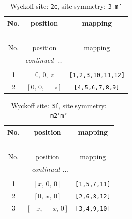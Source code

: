 \documentclass[fleqn,8pt]{jsarticle}
\begin{document}
\begin{longtable}{ccc}
\caption{Wyckoff site: {\tt 2e}, site symmetry: {\tt 3.m'}}
 \\
 \hline \hline
No. & position & mapping \\ \hline \endfirsthead

\multicolumn{2}{l}{\tablename\ \thetable{}} \\
 \hline \hline
No. & position & mapping \\ \hline \endhead

 \hline \hline
\multicolumn{2}{r}{\footnotesize\it continued ...} \\ \endfoot

 \hline \hline
\multicolumn{2}{r}{} \\ \endlastfoot

1 & $\left[ 0,\, 0,\, z \right]$ & {\tt [1,2,3,10,11,12]} \\ \hline
2 & $\left[ 0,\, 0,\, - z \right]$ & {\tt [4,5,6,7,8,9]} \\
\end{longtable}
\renewcommand{\arraystretch}{1.2}
\begin{longtable}{ccc}
\caption{Wyckoff site: {\tt 3f}, site symmetry: {\tt m2'm'}}
 \\
 \hline \hline
No. & position & mapping \\ \hline \endfirsthead

\multicolumn{2}{l}{\tablename\ \thetable{}} \\
 \hline \hline
No. & position & mapping \\ \hline \endhead

 \hline \hline
\multicolumn{2}{r}{\footnotesize\it continued ...} \\ \endfoot

 \hline \hline
\multicolumn{2}{r}{} \\ \endlastfoot

1 & $\left[ x,\, 0,\, 0 \right]$ & {\tt [1,5,7,11]} \\ \hline
2 & $\left[ 0,\, x,\, 0 \right]$ & {\tt [2,6,8,12]} \\ \hline
3 & $\left[ - x,\, - x,\, 0 \right]$ & {\tt [3,4,9,10]} \\
\end{longtable}
\renewcommand{\arraystretch}{1.2}
\end{document}
